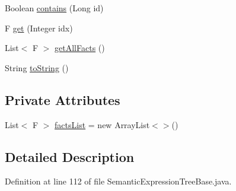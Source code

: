 \begin{DoxyCompactItemize}
\item 
Boolean \hyperlink{classit_1_1emarolab_1_1cagg_1_1core_1_1evaluation_1_1semanticGrammar_1_1syntaxCompiler_1_1Semanta17363eb7db3bfea12328c626a3d6723_aeef7a7811ad09892e4405a79e98ebfa1}{contains} (Long id)
\item 
F \hyperlink{classit_1_1emarolab_1_1cagg_1_1core_1_1evaluation_1_1semanticGrammar_1_1syntaxCompiler_1_1Semanta17363eb7db3bfea12328c626a3d6723_a25b7ce1c90e8f4de12f1b5b637ca4664}{get} (Integer idx)
\item 
List$<$ F $>$ \hyperlink{classit_1_1emarolab_1_1cagg_1_1core_1_1evaluation_1_1semanticGrammar_1_1syntaxCompiler_1_1Semanta17363eb7db3bfea12328c626a3d6723_a8fca9ddf4cd9548e31356f0ff70c118c}{get\-All\-Facts} ()
\item 
String \hyperlink{classit_1_1emarolab_1_1cagg_1_1core_1_1evaluation_1_1semanticGrammar_1_1syntaxCompiler_1_1Semanta17363eb7db3bfea12328c626a3d6723_a48cb99b406438e0f91d6ceff5a2b34ca}{to\-String} ()
\end{DoxyCompactItemize}
\subsection*{Private Attributes}
\begin{DoxyCompactItemize}
\item 
List$<$ F $>$ \hyperlink{classit_1_1emarolab_1_1cagg_1_1core_1_1evaluation_1_1semanticGrammar_1_1syntaxCompiler_1_1Semanta17363eb7db3bfea12328c626a3d6723_ab15dc4c7743f42af421fae7768c5eb54}{facts\-List} = new Array\-List$<$$>$()
\end{DoxyCompactItemize}


\subsection{Detailed Description}


Definition at line 112 of file Semantic\-Expression\-Tree\-Base.\-java.



